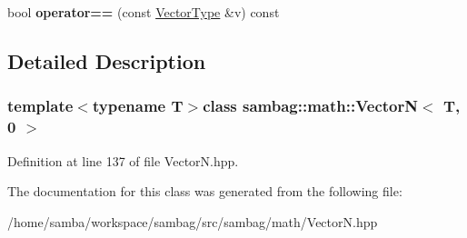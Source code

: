 \begin{DoxyCompactItemize}
\item 
\hypertarget{classsambag_1_1math_1_1_vector_n_3_01_t_00_010_01_4_a27c2e492c8f82307a138af3cb21742ab}{
bool {\bfseries operator==} (const \hyperlink{classsambag_1_1math_1_1_vector_n}{VectorType} \&v) const }
\label{classsambag_1_1math_1_1_vector_n_3_01_t_00_010_01_4_a27c2e492c8f82307a138af3cb21742ab}

\end{DoxyCompactItemize}


\subsection{Detailed Description}
\subsubsection*{template$<$typename T$>$class sambag::math::VectorN$<$ T, 0 $>$}



Definition at line 137 of file VectorN.hpp.



The documentation for this class was generated from the following file:\begin{DoxyCompactItemize}
\item 
/home/samba/workspace/sambag/src/sambag/math/VectorN.hpp\end{DoxyCompactItemize}
